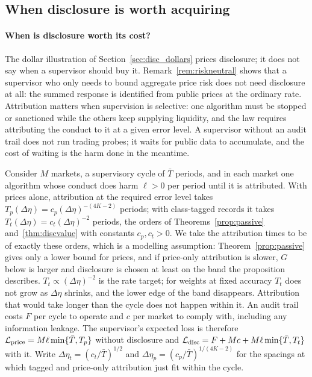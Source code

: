 \subsection{When disclosure is worth acquiring}\label{sec:decision}

\paragraph{When is disclosure worth its cost?} The dollar illustration of Section~\ref{sec:disc_dollars} prices disclosure; it does not say when a supervisor should buy it. Remark~\ref{rem:riskneutral} shows that a supervisor who only needs to bound aggregate price risk does not need disclosure at all: the summed response is identified from public prices at the ordinary rate. Attribution matters when supervision is selective: one algorithm must be stopped or sanctioned while the others keep supplying liquidity, and the law requires attributing the conduct to it at a given error level. A supervisor without an audit trail does not run trading probes; it waits for public data to accumulate, and the cost of waiting is the harm done in the meantime.

Consider $M$ markets, a supervisory cycle of $\bar T$ periods, and in each market one algorithm whose conduct does harm $\ell>0$ per period until it is attributed. With prices alone, attribution at the required error level takes $T_p(\Delta\eta)=c_p(\Delta\eta)^{-(4K-2)}$ periods; with class-tagged records it takes $T_t(\Delta\eta)=c_t(\Delta\eta)^{-2}$ periods, the orders of Theorems~\ref{prop:passive} and~\ref{thm:discvalue} with constants $c_p,c_t>0$. We take the attribution times to be of exactly these orders, which is a modelling assumption: Theorem~\ref{prop:passive} gives only a lower bound for prices, and if price-only attribution is slower, $G$ below is larger and disclosure is chosen at least on the band the proposition describes. $T_t\propto(\Delta\eta)^{-2}$ is the rate target; for weights at fixed accuracy $T_t$ does not grow as $\Delta\eta$ shrinks, and the lower edge of the band disappears. Attribution that would take longer than the cycle does not happen within it. An audit trail costs $F$ per cycle to operate and $c$ per market to comply with, including any information leakage. The supervisor's expected loss is therefore $\mathcal L_{\rm price}=M\ell\min\{\bar T,T_p\}$ without disclosure and $\mathcal L_{\rm disc}=F+Mc+M\ell\min\{\bar T,T_t\}$ with it. Write $\Delta\eta_t=(c_t/\bar T)^{1/2}$ and $\Delta\eta_p=(c_p/\bar T)^{1/(4K-2)}$ for the spacings at which tagged and price-only attribution just fit within the cycle.


